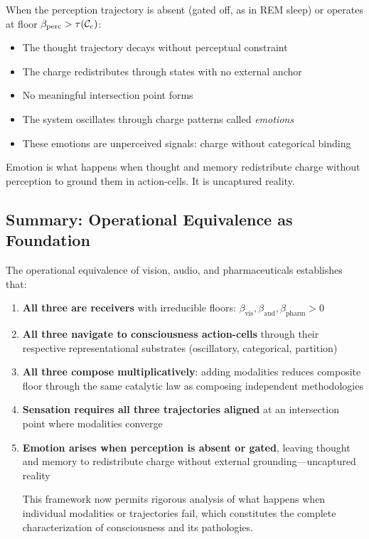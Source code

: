 \begin{proposition}
When the perception trajectory is absent (gated off, as in REM sleep) or operates at floor $\beta_{\text{perc}} > \tau(\mathcal{C}_c)$:
\begin{itemize}
\item The thought trajectory decays without perceptual constraint
\item The charge redistributes through states with no external anchor
\item No meaningful intersection point forms
\item The system oscillates through charge patterns called \emph{emotions}
\item These emotions are unperceived signals: charge without categorical binding
\end{itemize}

Emotion is what happens when thought and memory redistribute charge without perception to ground them in action-cells. It is uncaptured reality.
\end{proposition}

\subsection{Summary: Operational Equivalence as Foundation}

The operational equivalence of vision, audio, and pharmaceuticals establishes that:

\begin{enumerate}[leftmargin=1.3em]
\item \textbf{All three are receivers} with irreducible floors: $\beta_{\text{vis}}, \beta_{\text{aud}}, \beta_{\text{pharm}} > 0$

\item \textbf{All three navigate to consciousness action-cells} through their respective representational substrates (oscillatory, categorical, partition)

\item \textbf{All three compose multiplicatively}: adding modalities reduces composite floor through the same catalytic law as composing independent methodologies

\item \textbf{Sensation requires all three trajectories aligned} at an intersection point where modalities converge

\item \textbf{Emotion arises when perception is absent or gated}, leaving thought and memory to redistribute charge without external grounding—uncaptured reality

This framework now permits rigorous analysis of what happens when individual modalities or trajectories fail, which constitutes the complete characterization of consciousness and its pathologies.
\end{enumerate}
